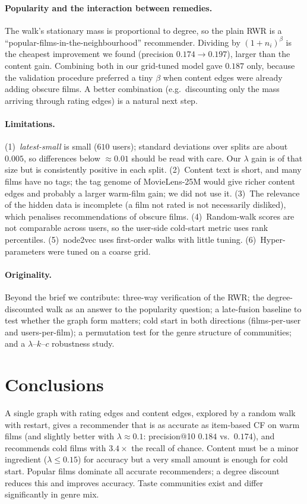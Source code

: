 \documentclass[11pt,a4paper]{article}
\begin{document}
\paragraph{Popularity and the interaction between remedies.} The walk's stationary mass is proportional to degree, so the plain RWR is a ``popular-films-in-the-neighbourhood'' recommender. Dividing by $(1+n_i)^{\beta}$ is the cheapest improvement we found (precision $0.174\to0.197$), larger than the content gain. Combining both in our grid-tuned model gave $0.187$ only, because the validation procedure preferred a tiny $\beta$ when content edges were already adding obscure films. A better combination (e.g.\ discounting only the mass arriving through rating edges) is a natural next step.

\paragraph{Limitations.} (1)~\emph{latest-small} is small ($610$ users); standard deviations over splits are about $0.005$, so differences below $\approx0.01$ should be read with care. Our $\lambda$ gain is of that size but is consistently positive in each split. (2)~Content text is short, and many films have no tags; the tag genome of MovieLens-25M would give richer content edges and probably a larger warm-film gain; we did not use it. (3)~The relevance of the hidden data is incomplete (a film not rated is not necessarily disliked), which penalises recommendations of obscure films. (4)~Random-walk scores are not comparable across users, so the user-side cold-start metric uses rank percentiles. (5)~node2vec uses first-order walks with little tuning. (6)~Hyper-parameters were tuned on a coarse grid.

\paragraph{Originality.} Beyond the brief we contribute: three-way verification of the RWR; the degree-discounted walk as an answer to the popularity question; a late-fusion baseline to test whether the graph form matters; cold start in both directions (films-per-user and users-per-film); a permutation test for the genre structure of communities; and a $\lambda$--$k$--$c$ robustness study.

\section{Conclusions}
A single graph with rating edges and content edges, explored by a random walk with restart, gives a recommender that is as accurate as item-based CF on warm films (and slightly better with $\lambda\approx0.1$: precision@10 $0.184$ vs.\ $0.174$), and recommends cold films with $3.4\times$ the recall of chance. Content must be a minor ingredient ($\lambda\le0.15$) for accuracy but a very small amount is enough for cold start. Popular films dominate all accurate recommenders; a degree discount reduces this and improves accuracy. Taste communities exist and differ significantly in genre mix.
\end{document}
